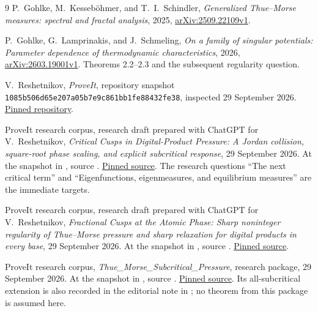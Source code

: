 \documentclass[11pt,a4paper]{article}
\numberwithin{equation}{section}
\theoremstyle{definition}
\theoremstyle{remark}
\begin{document}
\clearpage
\begin{thebibliography}{9}
P.~Gohlke, M.~Kesseb\"ohmer, and T.~I.~Schindler,
\emph{Generalized Thue--Morse measures: spectral and fractal analysis},
2025, \href{https://arxiv.org/abs/2509.22109v1}{arXiv:2509.22109v1}.

P.~Gohlke, G.~Lamprinakis, and J.~Schmeling,
\emph{On a family of singular potentials: Parameter dependence of
thermodynamic characteristics}, 2026,
\href{https://arxiv.org/abs/2603.19001v1}{arXiv:2603.19001v1}.
Theorems 2.2--2.3 and the subsequent regularity question.

V.~Reshetnikov, \emph{ProveIt}, repository snapshot
\nolinkurl{1085b506d65e207a05b7e9c861bb1fe88432fe38}, inspected
29 September 2026.
\href{https://github.com/VladimirReshetnikov/ProveIt/tree/1085b506d65e207a05b7e9c861bb1fe88432fe38}{Pinned repository}.

ProveIt research corpus, research draft prepared with ChatGPT for
V.~Reshetnikov,
\emph{Critical Cusps in Digital-Product Pressure: A Jordan collision,
square-root phase scaling, and explicit subcritical response},
29 September 2026. At the snapshot in \cite{Repo}, source
.
\href{https://github.com/VladimirReshetnikov/ProveIt/blob/1085b506d65e207a05b7e9c861bb1fe88432fe38/Analysis/FabiusFunction/docs/semi-formalized-research-frontiers/drafts/thue-morse/Thue_Morse_Critical_Pressure/article.tex}{Pinned source}.
The research questions ``The next critical term'' and ``Eigenfunctions,
eigenmeasures, and equilibrium measures'' are the immediate targets.

ProveIt research corpus, research draft prepared with ChatGPT for
V.~Reshetnikov,
\emph{Fractional Cusps at the Atomic Phase: Sharp noninteger regularity
of Thue--Morse pressure and sharp relaxation for digital products in
every base}, 29 September 2026. At the snapshot in \cite{Repo}, source
.
\href{https://github.com/VladimirReshetnikov/ProveIt/blob/1085b506d65e207a05b7e9c861bb1fe88432fe38/Analysis/FabiusFunction/docs/semi-formalized-research-frontiers/drafts/thue-morse/Thue_Morse_Fractional_Pressure/article.tex}{Pinned source}.

ProveIt research corpus,
\emph{Thue\_Morse\_Subcritical\_Pressure}, research package,
29 September 2026. At the snapshot in \cite{Repo}, source
.
\href{https://github.com/VladimirReshetnikov/ProveIt/blob/1085b506d65e207a05b7e9c861bb1fe88432fe38/Analysis/FabiusFunction/docs/semi-formalized-research-frontiers/drafts/thue-morse/Thue_Morse_Subcritical_Pressure/article.tex}{Pinned source}.
Its all-subcritical extension is also recorded in the editorial note in
\cite{CriticalRepo}; no theorem from this package is assumed here.
\end{thebibliography}
\end{document}
